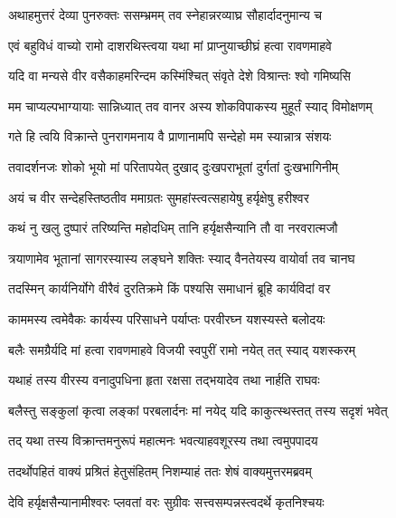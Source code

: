 
\twolineshloka
{अथाहमुत्तरं देव्या पुनरुक्तः ससम्भ्रमम्}
{तव स्नेहान्नरव्याघ्र सौहार्दादनुमान्य च} %

\twolineshloka
{एवं बहुविधं वाच्यो रामो दाशरथिस्त्वया}
{यथा मां प्राप्नुयाच्छीघ्रं हत्वा रावणमाहवे} %

\twolineshloka
{यदि वा मन्यसे वीर वसैकाहमरिन्दम}
{कस्मिंश्चित् संवृते देशे विश्रान्तः श्वो गमिष्यसि} %

\twolineshloka
{मम चाप्यल्पभाग्यायाः सान्निध्यात् तव वानर}
{अस्य शोकविपाकस्य मुहूर्तं स्याद् विमोक्षणम्} %

\twolineshloka
{गते हि त्वयि विक्रान्ते पुनरागमनाय वै}
{प्राणानामपि सन्देहो मम स्यान्नात्र संशयः} %

\twolineshloka
{तवादर्शनजः शोको भूयो मां परितापयेत्}
{दुखाद् दुःखपराभूतां दुर्गतां दुःखभागिनीम्} %

\twolineshloka
{अयं च वीर सन्देहस्तिष्ठतीव ममाग्रतः}
{सुमहांस्त्वत्सहायेषु हर्यृक्षेषु हरीश्वर} %

\twolineshloka
{कथं नु खलु दुष्पारं तरिष्यन्ति महोदधिम्}
{तानि हर्यृक्षसैन्यानि तौ वा नरवरात्मजौ} %

\twolineshloka
{त्रयाणामेव भूतानां सागरस्यास्य लङ्घने}
{शक्तिः स्याद् वैनतेयस्य वायोर्वा तव चानघ} %

\twolineshloka
{तदस्मिन् कार्यनिर्योगे वीरैवं दुरतिक्रमे}
{किं पश्यसि समाधानं ब्रूहि कार्यविदां वर} %

\twolineshloka
{काममस्य त्वमेवैकः कार्यस्य परिसाधने}
{पर्याप्तः परवीरघ्न यशस्यस्ते बलोदयः} %

\twolineshloka
{बलैः समग्रैर्यदि मां हत्वा रावणमाहवे}
{विजयी स्वपुरीं रामो नयेत् तत् स्याद् यशस्करम्} %

\twolineshloka
{यथाहं तस्य वीरस्य वनादुपधिना हृता}
{रक्षसा तद्भयादेव तथा नार्हति राघवः} %

\twolineshloka
{बलैस्तु सङ्कुलां कृत्वा लङ्कां परबलार्दनः}
{मां नयेद् यदि काकुत्स्थस्तत् तस्य सदृशं भवेत्} %

\twolineshloka
{तद् यथा तस्य विक्रान्तमनुरूपं महात्मनः}
{भवत्याहवशूरस्य तथा त्वमुपपादय} %

\twolineshloka
{तदर्थोपहितं वाक्यं प्रश्रितं हेतुसंहितम्}
{निशम्याहं ततः शेषं वाक्यमुत्तरमब्रवम्} %

\twolineshloka
{देवि हर्यृक्षसैन्यानामीश्वरः प्लवतां वरः}
{सुग्रीवः सत्त्वसम्पन्नस्त्वदर्थे कृतनिश्चयः} %


